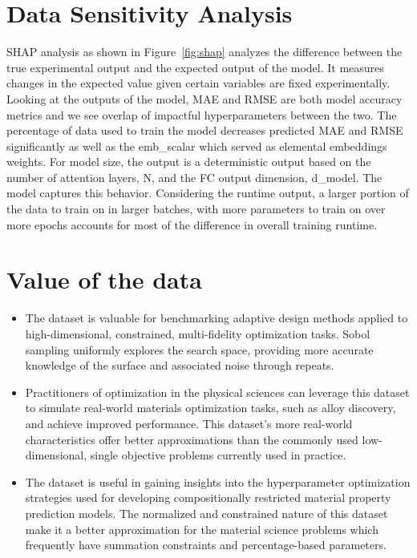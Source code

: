 \documentclass[pdflatex,sn-mathphys-num]{sn-jnl}
\begin{document}
\section{Data Sensitivity Analysis}

SHAP analysis as shown in Figure~\ref{fig:shap} analyzes the difference between the true experimental output and the expected output of the model. It measures changes in the expected value given certain variables are fixed experimentally. Looking at the outputs of the model, MAE and RMSE are both model accuracy metrics and we see overlap of impactful hyperparameters between the two. The percentage of data used to train the model decreases predicted MAE and RMSE significantly as well as the emb\_scalar which served as elemental embeddings weights. For model size, the output is a deterministic output based on the number of attention layers, N, and the FC output dimension, d\_model. The model captures this behavior. Considering the runtime output, a larger portion of the data to train on in larger batches, with more parameters to train on over more epochs accounts for most of the difference in overall training runtime.

\section{Value of the data}

\begin{itemize}
\item The dataset is valuable for benchmarking adaptive design methods applied to high-dimensional, constrained, multi-fidelity optimization tasks. Sobol sampling uniformly explores the search space, providing more accurate knowledge of the surface and associated noise through repeats.
\item Practitioners of optimization in the physical sciences can leverage this dataset to simulate real-world materials optimization tasks, such as alloy discovery, and achieve improved performance. This dataset's more real-world characteristics offer better approximations than the commonly used low-dimensional, single objective problems currently used in practice.
\item The dataset is useful in gaining insights into the hyperparameter optimization strategies used for developing compositionally restricted material property prediction models. The normalized and constrained nature of this dataset make it a better approximation for the material science problems which frequently have summation constraints and percentage-based parameters.
\end{itemize}
\end{document}
